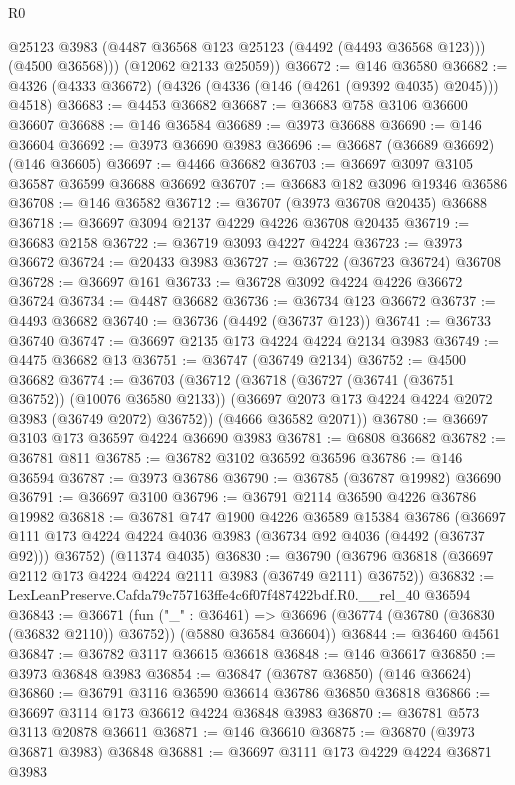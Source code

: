 \begin{lexlean}{R0}
\begin{coremodule}
          @25123
          @3983
          (@4487 @36568 @123 @25123 (@4492 (@4493 @36568 @123)))
          (@4500 @36568)))
      (@12062 @2133 @25059))
@36672 := @146 @36580
@36682 := @4326 (@4333 @36672) (@4326 (@4336 (@146 (@4261 (@9392 @4035) @2045))) @4518)
@36683 := @4453 @36682
@36687 := @36683 @758 @3106 @36600 @36607
@36688 := @146 @36584
@36689 := @3973 @36688
@36690 := @146 @36604
@36692 := @3973 @36690 @3983
@36696 := @36687 (@36689 @36692) (@146 @36605)
@36697 := @4466 @36682
@36703 := @36697 @3097 @3105 @36587 @36599 @36688 @36692
@36707 := @36683 @182 @3096 @19346 @36586
@36708 := @146 @36582
@36712 := @36707 (@3973 @36708 @20435) @36688
@36718 := @36697 @3094 @2137 @4229 @4226 @36708 @20435
@36719 := @36683 @2158
@36722 := @36719 @3093 @4227 @4224
@36723 := @3973 @36672
@36724 := @20433 @3983
@36727 := @36722 (@36723 @36724) @36708
@36728 := @36697 @161
@36733 := @36728 @3092 @4224 @4226 @36672 @36724
@36734 := @4487 @36682
@36736 := @36734 @123 @36672
@36737 := @4493 @36682
@36740 := @36736 (@4492 (@36737 @123))
@36741 := @36733 @36740
@36747 := @36697 @2135 @173 @4224 @4224 @2134 @3983
@36749 := @4475 @36682 @13
@36751 := @36747 (@36749 @2134)
@36752 := @4500 @36682
@36774 := @36703
    (@36712
      (@36718
        (@36727 (@36741 (@36751 @36752)) (@10076 @36580 @2133))
        (@36697 @2073 @173 @4224 @4224 @2072 @3983 (@36749 @2072) @36752))
      (@4666 @36582 @2071))
@36780 := @36697 @3103 @173 @36597 @4224 @36690 @3983
@36781 := @6808 @36682
@36782 := @36781 @811
@36785 := @36782 @3102 @36592 @36596
@36786 := @146 @36594
@36787 := @3973 @36786
@36790 := @36785 (@36787 @19982) @36690
@36791 := @36697 @3100
@36796 := @36791 @2114 @36590 @4226 @36786 @19982
@36818 := @36781
    @747
    @1900
    @4226
    @36589
    @15384
    @36786
    (@36697 @111 @173 @4224 @4224 @4036 @3983 (@36734 @92 @4036 (@4492 (@36737 @92))) @36752)
    (@11374 @4035)
@36830 := @36790 (@36796 @36818 (@36697 @2112 @173 @4224 @4224 @2111 @3983 (@36749 @2111) @36752))
@36832 := LexLeanPreserve.Cafda79c757163ffe4c6f07f487422bdf.R0.__rel_40 @36594
@36843 := @36671
    (fun ("_" : @36461) =>
    @36696 (@36774 (@36780 (@36830 (@36832 @2110)) @36752)) (@5880 @36584 @36604))
@36844 := @36460 @4561
@36847 := @36782 @3117 @36615 @36618
@36848 := @146 @36617
@36850 := @3973 @36848 @3983
@36854 := @36847 (@36787 @36850) (@146 @36624)
@36860 := @36791 @3116 @36590 @36614 @36786 @36850 @36818
@36866 := @36697 @3114 @173 @36612 @4224 @36848 @3983
@36870 := @36781 @573 @3113 @20878 @36611
@36871 := @146 @36610
@36875 := @36870 (@3973 @36871 @3983) @36848
@36881 := @36697 @3111 @173 @4229 @4224 @36871 @3983

\end{coremodule}
\end{lexlean}
